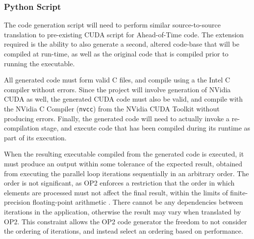 \subsubsection{Python Script}
The code generation script will need to perform similar source-to-source translation to pre-existing CUDA script for Ahead-of-Time code. The extension required is the ability to also generate a second, altered code-base that will be compiled at run-time, as well as the original code that is compiled prior to running the executable. \par
All generated code must form valid C files, and compile using a the Intel C compiler \cite{icc} without errors. Since the project will involve generation of NVidia CUDA as well, the generated CUDA code must also be valid, and compile with the NVidia C Compiler (\verb|nvcc|) from the NVidia CUDA Toolkit \cite{nvcc,toolkit} without producing errors. Finally, the generated code will need to actually invoke a re-compilation stage, and execute code that has been compiled during its runtime as part of its execution.
\par
When the resulting executable compiled from the generated code is executed, it must produce an output within some tolerance of the expected result, obtained from executing the parallel loop iterations sequentially in an arbitrary order. The order is not significant, as OP2 enforces a restriction that the order in which elements are processed must not affect the final result, within the limits of finite-precision floating-point arithmetic \cite[p3]{op2main}. There cannot be any dependencies between iterations in the application, otherwise the result may vary when translated by OP2. This constraint allows the OP2 code generator the freedom to not consider the ordering of iterations, and instead select an ordering based on performance.

